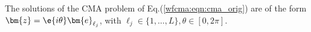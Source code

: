 The solutions of the CMA problem of Eq.(\ref{wfcma:eqn:cma_orig}) are of the form $\bm{z}=\e{i\theta}\bm{e}_{\ell_j}$, with  $\ell_j\in\{1,\ldots,L\}, \theta\in[0,2\pi]$. 
%


